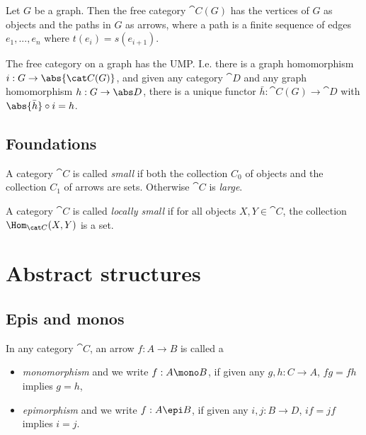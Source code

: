 \documentclass{article}
\begin{document}
\begin{definition}
    Let $G$ be a graph. Then the free category $\cat C(G)$ has the vertices
    of $G$ as objects and the paths in $G$ as arrows, where a path is a finite
    sequence of edges $e_1,...,e_n$ where $t(e_i)=s(e_{i+1})$.
\end{definition}

\begin{definition}
    The free category on a graph has the UMP. I.e. there is a graph
    homomorphism $i:G\to\abs{\cat C(G)}$, and given any category $\cat D$
    and any graph homomorphism $h:G\to\abs D$, there is a unique functor
    $\bar h:\cat C(G)\to \cat D$ with $\abs{\bar h}\circ i = h$.    
\end{definition}

\subsection{Foundations}

\begin{definition}
    A category $\cat C$ is called \emph{small} if both the collection $C_0$
    of objects and the collection $C_1$ of arrows are sets. Otherwise $\cat C$
    is \emph{large}.
\end{definition}

\begin{definition}
    A category $\cat C$ is called \emph{locally small} if for all objects
    $X,Y\in\cat C$, the collection $\Hom_{\cat C}(X,Y)$ is a set.
\end{definition}

\section{Abstract structures}


\subsection{Epis and monos}

\begin{definition}
    In any category $\cat C$, an arrow $f:A\to B$ is called a
    \begin{itemize}
        \item \emph{monomorphism} and we write $f:A\mono B$, if given any $g,h:C\to A$, $fg=fh$ implies $g=h$,
        \item \emph{epimorphism} and we write $f:A\epi B$, if given any $i,j:B\to D$, $if=jf$ implies $i=j$. 
    \end{itemize}
\end{definition}
\end{document}
